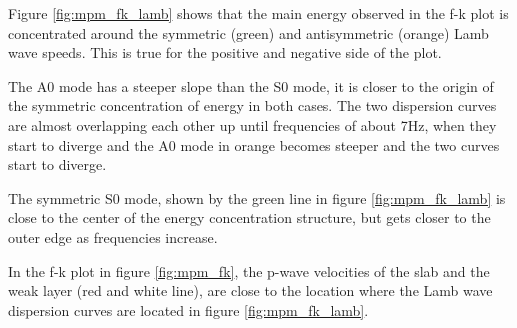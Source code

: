 Figure \ref{fig:mpm_fk_lamb} shows that the main energy observed in the f-k plot is concentrated around the symmetric (green) and antisymmetric (orange) Lamb wave speeds. This is true for the positive and negative side of the plot. \par

The A0 mode has a steeper slope than the S0 mode, it is closer to the origin of the symmetric concentration of energy in both cases. The two dispersion curves are almost overlapping each other up until frequencies of about 7Hz, when they start to diverge and the A0 mode in orange becomes steeper and the two curves start to diverge. \par

The symmetric S0 mode, shown by the green line in figure \ref{fig:mpm_fk_lamb} is close to the center of the energy concentration structure, but gets closer to the outer edge as frequencies increase. \par 

In the f-k plot in figure \ref{fig:mpm_fk}, the p-wave velocities of the slab and the weak layer (red and white line), are close to the location where the Lamb wave dispersion curves are located in figure \ref{fig:mpm_fk_lamb}. \par 


